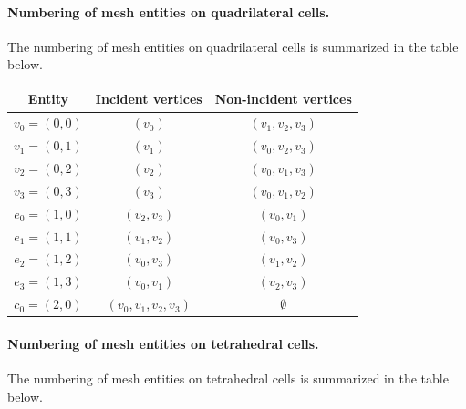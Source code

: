 \paragraph{Numbering of mesh entities on quadrilateral cells.}

The numbering of mesh entities on quadrilateral cells is summarized in the
table below.

\begin{center}
  \begin{tabular}{ccc}
    \toprule
    Entity & Incident vertices & Non-incident vertices \\
    \hline
    $v_0 = (0, 0)$ & $(v_0)$ & $(v_1, v_2, v_3)$ \\
    $v_1 = (0, 1)$ & $(v_1)$ & $(v_0, v_2, v_3)$ \\
    $v_2 = (0, 2)$ & $(v_2)$ & $(v_0, v_1, v_3)$ \\
    $v_3 = (0, 3)$ & $(v_3)$ & $(v_0, v_1, v_2)$ \\
    $e_0 = (1, 0)$ & $(v_2, v_3)$ & $(v_0, v_1)$ \\
    $e_1 = (1, 1)$ & $(v_1, v_2)$ & $(v_0, v_3)$ \\
    $e_2 = (1, 2)$ & $(v_0, v_3)$ & $(v_1, v_2)$ \\
    $e_3 = (1, 3)$ & $(v_0, v_1)$ & $(v_2, v_3)$ \\
    $c_0 = (2, 0)$ & $(v_0, v_1, v_2, v_3)$ & $\emptyset$ \\
    \bottomrule
  \end{tabular}
\end{center}

\paragraph{Numbering of mesh entities on tetrahedral cells.}

The numbering of mesh entities on tetrahedral cells is summarized in the
table below.

